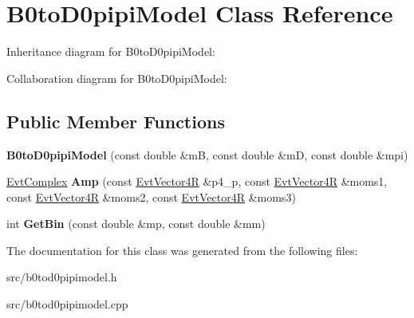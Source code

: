 \hypertarget{class_b0to_d0pipi_model}{}\section{B0to\+D0pipi\+Model Class Reference}
\label{class_b0to_d0pipi_model}


Inheritance diagram for B0to\+D0pipi\+Model\+:


Collaboration diagram for B0to\+D0pipi\+Model\+:
\subsection*{Public Member Functions}
\begin{DoxyCompactItemize}
\item 
\hypertarget{class_b0to_d0pipi_model_ae122dc2458ef16cd86000edd9e54164a}{}{\bfseries B0to\+D0pipi\+Model} (const double \&m\+B, const double \&m\+D, const double \&mpi)\label{class_b0to_d0pipi_model_ae122dc2458ef16cd86000edd9e54164a}

\item 
\hypertarget{class_b0to_d0pipi_model_a0cc35ae9d1f8e164ef5faceb93bbac98}{}\hyperlink{class_evt_complex}{Evt\+Complex} {\bfseries Amp} (const \hyperlink{class_evt_vector4_r}{Evt\+Vector4\+R} \&p4\+\_\+p, const \hyperlink{class_evt_vector4_r}{Evt\+Vector4\+R} \&moms1, const \hyperlink{class_evt_vector4_r}{Evt\+Vector4\+R} \&moms2, const \hyperlink{class_evt_vector4_r}{Evt\+Vector4\+R} \&moms3)\label{class_b0to_d0pipi_model_a0cc35ae9d1f8e164ef5faceb93bbac98}

\item 
\hypertarget{class_b0to_d0pipi_model_a94d89fb6d4678ee5d41fdf88ea36619c}{}int {\bfseries Get\+Bin} (const double \&mp, const double \&mm)\label{class_b0to_d0pipi_model_a94d89fb6d4678ee5d41fdf88ea36619c}

\end{DoxyCompactItemize}


The documentation for this class was generated from the following files\+:\begin{DoxyCompactItemize}
\item 
src/b0tod0pipimodel.\+h\item 
src/b0tod0pipimodel.\+cpp\end{DoxyCompactItemize}
